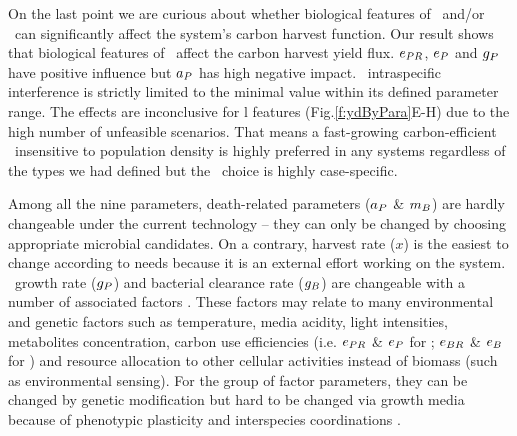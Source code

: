 \documentclass[../thesis.tex]{subfiles} %
\begin{document}
On the last point we are curious about whether biological features of \phy\ and/or \bac\ can significantly affect the system’s carbon harvest function.  Our result shows that biological features of \phy\ affect the carbon harvest yield flux.  $e_{PR}$, $e_P$ and $g_P$ have positive influence but $a_P$ has high negative impact.  \Phy\ intraspecific interference is strictly limited to the minimal value within its defined parameter range.  The effects are inconclusive for \bac l features (Fig.\ref{f:ydByPara}E-H) due to the high number of unfeasible scenarios.  That means a fast-growing carbon-efficient \phy\ insensitive to population density is highly preferred in any systems regardless of the types we had defined but the \bac\ choice is highly case-specific.

Among all the nine parameters, death-related parameters ($a_P$ \& $m_B$) are hardly changeable under the current technology -- they can only be changed by choosing appropriate microbial candidates.  On a contrary, harvest rate ($x$) is the easiest to change according to needs because it is an external effort working on the system.  \Phy\ growth rate ($g_P$) and bacterial clearance rate ($g_B$) are changeable with a number of associated factors \autocite{park2020potential}.  These factors may relate to many environmental and genetic factors such as temperature, media acidity, light intensities, metabolites concentration, carbon use efficiencies (i.e. $e_{PR}$ \& $e_P$ for \phy; $e_{BR}$ \& $e_B$ for \bac) and resource allocation to other cellular activities instead of biomass (such as environmental sensing).  For the group of factor parameters, they can be changed by genetic modification \autocite{moniruzzaman1996ethanol} but hard to be changed via growth media because of phenotypic plasticity \autocite{j1989respiration,bratbak1985phytoplankton,samejima1958heterotrophic} and interspecies coordinations \autocite{beliaev2014inference,amin2012interactions}.
\end{document}
